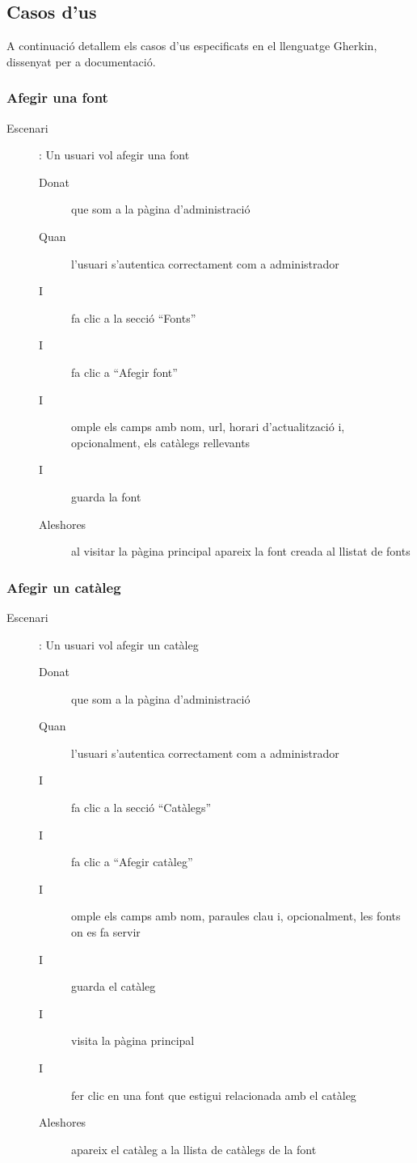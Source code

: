 \documentclass{article}
\begin{document}
\newpage

\subsection{Casos d'us}

A continuació detallem els casos d'us especificats en el llenguatge Gherkin, dissenyat per a documentació.

\subsubsection{Afegir una font}

\begin{description}
    \item[Escenari]: Un usuari vol afegir una font
    \begin{description}
        \item[Donat] que som a la pàgina d'administració
        \item[Quan] l'usuari s'autentica correctament com a administrador
        \item[I] fa clic a la secció ``Fonts''
        \item[I] fa clic a ``Afegir font''
        \item[I] omple els camps amb nom, url, horari d'actualització i, opcionalment, els catàlegs rellevants
        \item[I] guarda la font
        \item[Aleshores] al visitar la pàgina principal apareix la font creada al llistat de fonts
    \end{description}
\end{description}

\subsubsection{Afegir un catàleg}

\begin{description}
    \item[Escenari]: Un usuari vol afegir un catàleg
    \begin{description}
        \item[Donat] que som a la pàgina d'administració
        \item[Quan] l'usuari s'autentica correctament com a administrador
        \item[I] fa clic a la secció ``Catàlegs''
        \item[I] fa clic a ``Afegir catàleg''
        \item[I] omple els camps amb nom, paraules clau i, opcionalment, les fonts on es fa servir
        \item[I] guarda el catàleg
        \item[I] visita la pàgina principal
        \item[I] fer clic en una font que estigui relacionada amb el catàleg
        \item[Aleshores] apareix el catàleg a la llista de catàlegs de la font
    \end{description}
\end{description}
\end{document}
